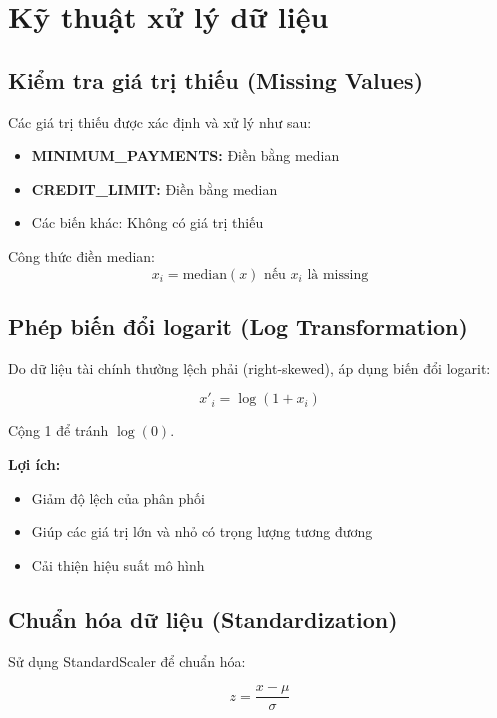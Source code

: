\section{Kỹ thuật xử lý dữ liệu}

\subsection{Kiểm tra giá trị thiếu (Missing Values)}

Các giá trị thiếu được xác định và xử lý như sau:
\begin{itemize}
    \item \textbf{MINIMUM\_PAYMENTS:} Điền bằng median
    \item \textbf{CREDIT\_LIMIT:} Điền bằng median
    \item Các biến khác: Không có giá trị thiếu
\end{itemize}

Công thức điền median:
\begin{equation}
x_i = \text{median}(x) \text{ nếu } x_i \text{ là missing}
\end{equation}

\subsection{Phép biến đổi logarit (Log Transformation)}

Do dữ liệu tài chính thường lệch phải (right-skewed), áp dụng biến đổi logarit:

\begin{equation}
x'_i = \log(1 + x_i)
\end{equation}

Cộng 1 để tránh $\log(0)$.

\textbf{Lợi ích:}
\begin{itemize}
    \item Giảm độ lệch của phân phối
    \item Giúp các giá trị lớn và nhỏ có trọng lượng tương đương
    \item Cải thiện hiệu suất mô hình
\end{itemize}

\subsection{Chuẩn hóa dữ liệu (Standardization)}

Sử dụng StandardScaler để chuẩn hóa:

\begin{equation}
z = \frac{x - \mu}{\sigma}
\end{equation}


